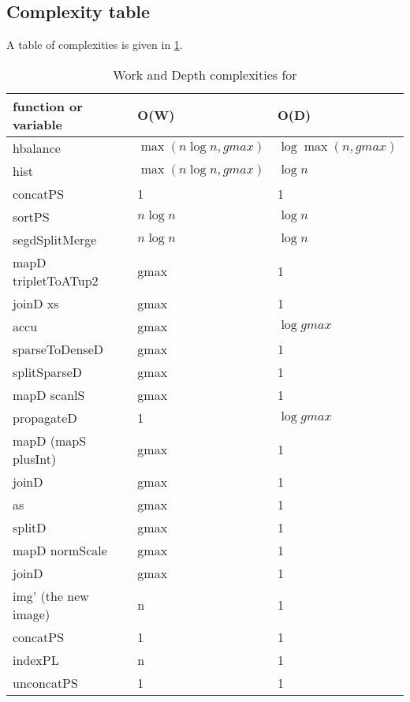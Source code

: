     \subsection*{Complexity table}
      A table of complexities is given in \ref{complexities_ndpv}.
      \begin{table}[h]
        \caption{Work and Depth complexities for \ndpv}
        \label{complexities_ndpv}
        \begin{tabular}{lll}
          \toprule
          function or variable &      O(W)           & O(D) \\
          \midrule
          hbalance        & $\max(n \log n, gmax)$& $\log \max(n, gmax)$ \\
          \midrule
          hist            & $\max(n \log n, gmax)$& $\log n$ \\
          concatPS        & 1                   & 1 \\
          sortPS          & $n \log n$          & $\log n$ \\
          segdSplitMerge  & $n \log n$          & $\log n$ \\
          mapD tripletToATup2  & gmax           & 1 \\
          joinD xs        & gmax                & 1 \\
          \midrule
          accu            & gmax                & $\log gmax$ \\
          sparseToDenseD  & gmax                & 1 \\
          splitSparseD    & gmax                & 1 \\
          mapD scanlS     & gmax                & 1 \\
          propagateD      & 1                   & $\log gmax$ \\
          mapD (mapS plusInt) & gmax            & 1 \\
          joinD           & gmax                & 1 \\
          \midrule
          as              & gmax                & 1 \\
          splitD          & gmax                & 1 \\
          mapD normScale  & gmax                & 1 \\
          joinD           & gmax                & 1 \\ %
          \midrule
          img' (the new image)     & n                   & 1 \\
          concatPS        & 1                   & 1 \\
          indexPL         & n                   & 1 \\
          unconcatPS      & 1                   & 1 \\
        \end{tabular}
      \end{table}
      
